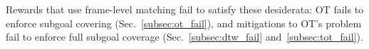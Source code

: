 Rewards that use frame-level matching fail to satisfy these desiderata: OT fails to enforce subgoal covering (Sec.~\ref{subsec:ot_fail}), and mitigations to OT's problem fail to enforce full subgoal coverage (Sec.~\ref{subsec:dtw_fail} and~\ref{subsec:tot_fail}). 



